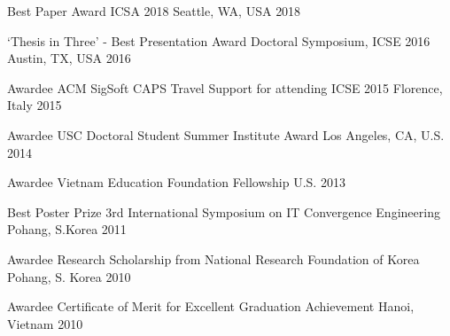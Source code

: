 \vspace{-1mm}



\begin{cvhonors}

  \cvhonor
    {Best Paper Award} %
    {ICSA 2018} %
    {Seattle, WA, USA} %
    {2018} %

  \cvhonor
    {`Thesis in Three' - Best Presentation Award} %
    {Doctoral Symposium, ICSE 2016} %
    {Austin, TX, USA} %
    {2016} %

  \cvhonor
    {Awardee} %
    {ACM SigSoft CAPS Travel Support for attending ICSE 2015} %
    {Florence, Italy} %
    {2015} %

  \cvhonor
    {Awardee} %
    {USC Doctoral Student Summer Institute Award} %
    {Los Angeles, CA, U.S.} %
    {2014} %

  \cvhonor
    {Awardee} %
    {Vietnam Education Foundation Fellowship} %
    {U.S.} %
    {2013} %

  \cvhonor
    {Best Poster Prize} %
    {%
    	3rd International Symposium on IT Convergence Engineering} %
    {Pohang, S.Korea} %
    {2011} %
   
	\cvhonor
	{Awardee} %
	{Research Scholarship from National Research Foundation of Korea} %
	{Pohang, S. Korea} %
	{2010} %

	\cvhonor
	{Awardee} %
	{Certificate of Merit for Excellent Graduation Achievement} %
	{Hanoi, Vietnam} %
	{2010} %

\end{cvhonors}


